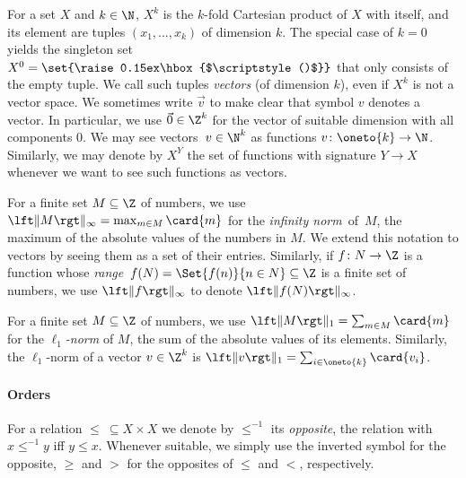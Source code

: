 \documentclass[../../diss.tex]{subfiles}
\begin{document}

For a set $X$ and $k \in \N$, $X^k$ is the $k$-fold Cartesian product of $X$ with itself, and its element are tuples $(x_1, \ldots, x_k)$ of dimension $k$.
The special case of $k = 0$ yields the singleton set $X^0 = \set{\raise0.15ex\hbox{$\scriptstyle()$}} $ that only consists of the empty tuple.
We call such tuples \emph{vectors} (of dimension $k$), even if $X^k$ is not a vector space.
We sometimes write $\vec{v}$ to make clear that symbol $v$ denotes a vector.
In particular, we use $\vec{0} \in \Z^k$ for the vector of suitable dimension with all components $0$.
We may see vectors~$v \in \N^k$ as functions $v \colon \oneto{k} \to \N$.
Similarly, we may denote by $X^Y$ the set of functions with signature $Y \to X$ whenever we want to see such functions as vectors.


For a finite set $M \subseteq \Z$ of numbers, we use
\(
    \norminf{M} = \max_{m \in M} \card{m}
\)
for the \emph{infinity norm}~of~$M$, the maximum of the absolute values of the numbers in $M$.
We extend this notation to vectors by seeing them as a set of their entries.
Similarly, if $f \colon N \to \Z$ is a function whose \emph{range}~$f (N) = \Set{f(n)}{n \in N} \subseteq \Z$ is a finite set of numbers, we use $\norminf{f}$ to denote $\norminf{f(N)}$.

For a finite set $M \subseteq \Z$ of numbers, we use
\(
    \normone{M} = \sum_{m \in M} \card{m}
\)
for the \emph{$\ell_1$-norm} of $M$, the sum of the absolute values of its elements.
Similarly, the $\ell_1$-norm of a vector $v \in \Z^k$ is $\normone{v} = \sum_{i \in \oneto{k}} \card{v_i}$.

\paragraph{Orders}

For a relation $\leq \ \subseteq X \times X$ we denote by $\leq^{-1}$ its \emph{opposite}, the relation with $x \leq^{-1} y$ iff $y \leq x$.
Whenever suitable, we simply use the inverted symbol for the opposite, \eg $\geq$ and $>$ for the opposites of $\leq$ and $<$, respectively.
\end{document}
